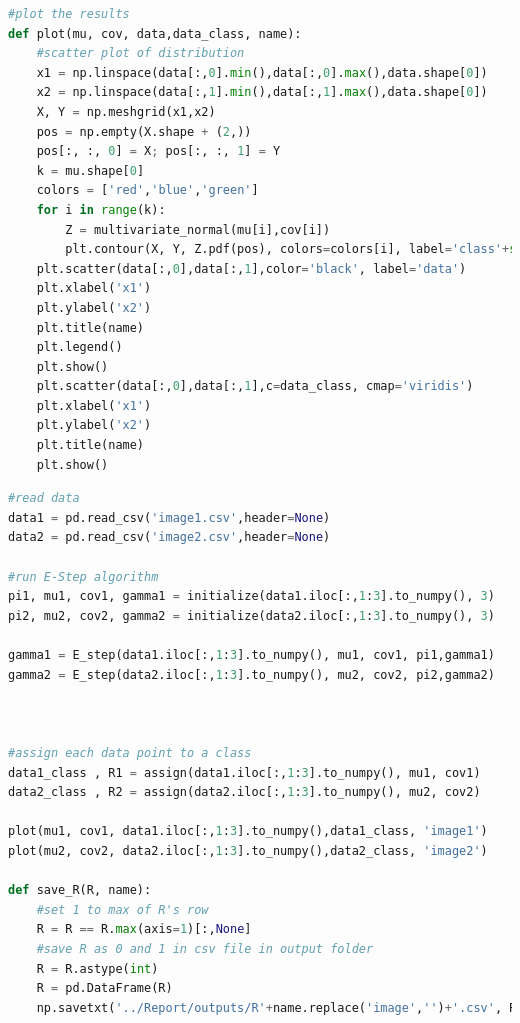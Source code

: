\documentclass[12pt]{article}
\begin{document}
\begin{qsolve}
\begin{lstlisting}[language=Python,caption={Simulation Question 2.},label={code:Simulation Question 2.}]
#plot the results
def plot(mu, cov, data,data_class, name):
    #scatter plot of distribution
    x1 = np.linspace(data[:,0].min(),data[:,0].max(),data.shape[0])
    x2 = np.linspace(data[:,1].min(),data[:,1].max(),data.shape[0])
    X, Y = np.meshgrid(x1,x2)
    pos = np.empty(X.shape + (2,))
    pos[:, :, 0] = X; pos[:, :, 1] = Y
    k = mu.shape[0]
    colors = ['red','blue','green']
    for i in range(k):
        Z = multivariate_normal(mu[i],cov[i])
        plt.contour(X, Y, Z.pdf(pos), colors=colors[i], label='class'+str(i+1))
    plt.scatter(data[:,0],data[:,1],color='black', label='data')
    plt.xlabel('x1')
    plt.ylabel('x2')
    plt.title(name)
    plt.legend()
    plt.show()
    plt.scatter(data[:,0],data[:,1],c=data_class, cmap='viridis')
    plt.xlabel('x1')
    plt.ylabel('x2')
    plt.title(name)
    plt.show()
    \end{lstlisting}
    \splitqsolve
    \begin{lstlisting}[language=Python,caption={Simulation Question 2.},label={code:Simulation Question 2.}]
#read data
data1 = pd.read_csv('image1.csv',header=None)
data2 = pd.read_csv('image2.csv',header=None)

#run E-Step algorithm
pi1, mu1, cov1, gamma1 = initialize(data1.iloc[:,1:3].to_numpy(), 3)
pi2, mu2, cov2, gamma2 = initialize(data2.iloc[:,1:3].to_numpy(), 3)

gamma1 = E_step(data1.iloc[:,1:3].to_numpy(), mu1, cov1, pi1,gamma1)
gamma2 = E_step(data2.iloc[:,1:3].to_numpy(), mu2, cov2, pi2,gamma2)



#assign each data point to a class
data1_class , R1 = assign(data1.iloc[:,1:3].to_numpy(), mu1, cov1)
data2_class , R2 = assign(data2.iloc[:,1:3].to_numpy(), mu2, cov2)

plot(mu1, cov1, data1.iloc[:,1:3].to_numpy(),data1_class, 'image1')
plot(mu2, cov2, data2.iloc[:,1:3].to_numpy(),data2_class, 'image2')

def save_R(R, name):
    #set 1 to max of R's row
    R = R == R.max(axis=1)[:,None]
    #save R as 0 and 1 in csv file in output folder
    R = R.astype(int)
    R = pd.DataFrame(R)
    np.savetxt('../Report/outputs/R'+name.replace('image','')+'.csv', R, delimiter=',', fmt='%d')


\end{lstlisting}
\end{qsolve}
\end{document}
